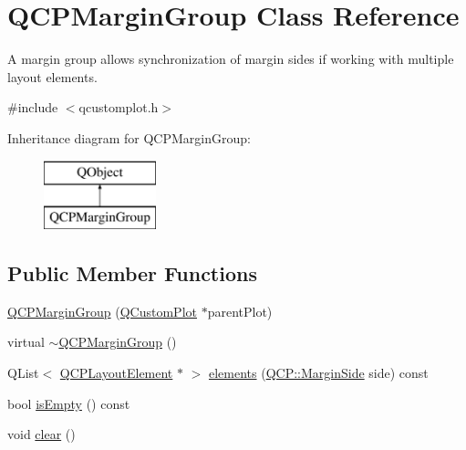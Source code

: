 \hypertarget{class_q_c_p_margin_group}{}\section{Q\+C\+P\+Margin\+Group Class Reference}
\label{class_q_c_p_margin_group}


A margin group allows synchronization of margin sides if working with multiple layout elements.  




{\ttfamily \#include $<$qcustomplot.\+h$>$}

Inheritance diagram for Q\+C\+P\+Margin\+Group\+:\begin{figure}[H]
\begin{center}
\leavevmode
\includegraphics[height=2.000000cm]{d5/d08/class_q_c_p_margin_group}
\end{center}
\end{figure}
\subsection*{Public Member Functions}
\begin{DoxyCompactItemize}
\item 
\mbox{\hyperlink{class_q_c_p_margin_group_ac481c20678ec5b305d6df330715f4b7b}{Q\+C\+P\+Margin\+Group}} (\mbox{\hyperlink{class_q_custom_plot}{Q\+Custom\+Plot}} $\ast$parent\+Plot)
\item 
virtual \mbox{\hyperlink{class_q_c_p_margin_group_a42c62becdaac41406ca90f1c2a755e1c}{$\sim$\+Q\+C\+P\+Margin\+Group}} ()
\item 
Q\+List$<$ \mbox{\hyperlink{class_q_c_p_layout_element}{Q\+C\+P\+Layout\+Element}} $\ast$ $>$ \mbox{\hyperlink{class_q_c_p_margin_group_ac967a4dc5fe02ae44aeb43511d5e1bd4}{elements}} (\mbox{\hyperlink{namespace_q_c_p_a7e487e3e2ccb62ab7771065bab7cae54}{Q\+C\+P\+::\+Margin\+Side}} side) const
\item 
bool \mbox{\hyperlink{class_q_c_p_margin_group_ae0d32656d8a5fc5690c4e7693f9d0539}{is\+Empty}} () const
\item 
void \mbox{\hyperlink{class_q_c_p_margin_group_a144b67f216e4e86c3a3a309e850285fe}{clear}} ()
\end{DoxyCompactItemize}

